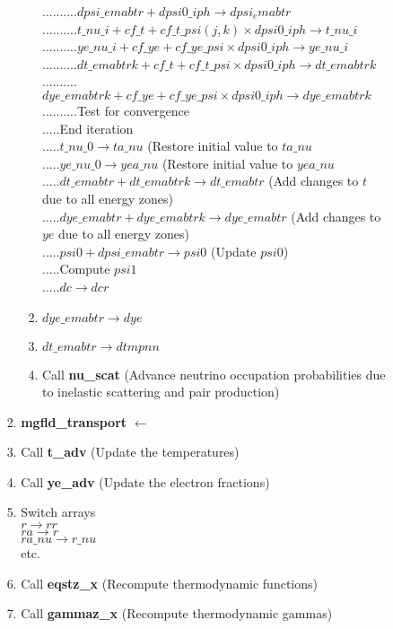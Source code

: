 \documentclass[11pt,doublespace]{article}
\begin{document}
\begin{itemize}
\begin{enumerate}
\begin{enumerate}
\begin{enumerate}
\begin{enumerate}
..........$dpsi\_emabtr + dpsi0\_iph \rightarrow dpsi_emabtr$\\
..........$t\_nu\_i + cf\_t + cf\_t\_psi(j,k)  \times dpsi0\_iph \rightarrow t\_nu\_i$\\
..........$ye\_nu\_i + cf\_ye + cf\_ye\_psi \times dpsi0\_iph \rightarrow ye\_nu\_i$\\
..........$dt\_emabtrk + cf\_t  + cf\_t\_psi \times dpsi0\_iph \rightarrow dt\_emabtrk$\\
..........$dye\_emabtrk + cf\_ye + cf\_ye\_psi \times dpsi0\_iph \rightarrow dye\_emabtrk$\\
..........Test for convergence\\
.....End iteration\\
.....$t\_nu\_0 \rightarrow ta\_nu$ (Restore initial value to $ta\_nu$\\
.....$ye\_nu\_0 \rightarrow yea\_nu$ (Restore initial value to $yea\_nu$\\
.....$dt\_emabtr  + dt\_emabtrk \rightarrow dt\_emabtr$ (Add changes to $t$ due to all energy zones)\\
.....$dye\_emabtr  + dye\_emabtrk \rightarrow dye\_emabtr$ (Add changes to $ye$ due to all energy zones)\\
.....$psi0 + dpsi\_emabtr \rightarrow psi0$ (Update $psi0$)\\
.....Compute $psi1$\\
.....$dc \rightarrow dcr$
  \item $dye\_emabtr \rightarrow dye$
  \item $dt\_emabtr \rightarrow dtmpnn$
  \item Call {\bf nu\_scat} (Advance neutrino occupation probabilities due to inelastic scattering and pair production)
\end{enumerate}
  \item {\bf mgfld\_transport} $\leftarrow$
  \item Call {\bf t\_adv} (Update the temperatures)
  \item Call {\bf ye\_adv} (Update the electron fractions)
  \item Switch arrays\\
  $r \rightarrow rr$\\
  $ra \rightarrow r$\\
  $ra\_nu \rightarrow r\_nu$\\
  etc.
  \item Call {\bf eqstz_x} (Recompute thermodynamic functions)
  \item Call {\bf gammaz_x} (Recompute thermodynamic gammas)

\end{enumerate}
\end{enumerate}
\end{enumerate}
\end{itemize}
\end{document}
